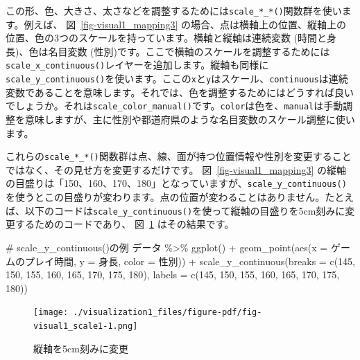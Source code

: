 \documentclass[
  a4paper,
  pandoc,
  ja=standard,
  jafont=haranoaji]{bxjsbook}
\newenvironment{Shaded}{\begin{snugshade}}{\end{snugshade}}
\newcommand{\AttributeTok}[1]{\textcolor[rgb]{0.00,0.48,0.65}{#1}}
\newcommand{\CommentTok}[1]{\textcolor[rgb]{0.37,0.37,0.37}{#1}}
\newcommand{\DecValTok}[1]{\textcolor[rgb]{0.68,0.00,0.00}{#1}}
\newcommand{\FunctionTok}[1]{\textcolor[rgb]{0.28,0.35,0.67}{#1}}
\newcommand{\NormalTok}[1]{\textcolor[rgb]{0.00,0.48,0.65}{#1}}
\newcommand{\SpecialCharTok}[1]{\textcolor[rgb]{0.37,0.37,0.37}{#1}}
\begin{document}
この形、色、大きさ、太さなどを調整するためには\texttt{scale\_*\_*()}関数群を使います。例えば、
図~\ref{fig-visual1_mapping3}
の場合、点は横軸上の位置、縦軸上の位置、色の3つのスケールを持っています。横軸と縦軸は連続変数
(時間と身長)、色は名目変数
(性別)です。ここで横軸のスケールを調整するためには\texttt{scale\_x\_continuous()}レイヤーを追加します。縦軸も同様に\texttt{scale\_y\_continuous()}を使います。ここの\texttt{x}と\texttt{y}はスケール、\texttt{continuous}は連続変数であることを意味します。それでは、色を調整するためにはどうすれば良いでしょうか。それは\texttt{scale\_color\_manual()}です。\texttt{color}は色を、\texttt{manual}は手動調整を意味しますが、主に性別や都道府県のような名目変数のスケール調整に使います。

これらの\texttt{scale\_*\_*()}関数群は点、線、面が持つ位置情報や性別を変更することではなく、その見せ方を変更するだけです。
図~\ref{fig-visual1_mapping3}
の縦軸の目盛りは「150、160、170、180」となっていますが、\texttt{scale\_y\_continuous()}を使うとこの目盛りが変わります。点の位置が変わることはありません。たとえば、以下のコードは\texttt{scale\_y\_continuous()}を使って縦軸の目盛りを5cm刻みに変更するためのコードであり、
図~\ref{fig-visual1_scale1} はその結果です。

\begin{Shaded}
\begin{Highlighting}[numbers=left,,]
\CommentTok{\# scale\_y\_continuous()の例}
\NormalTok{データ }\SpecialCharTok{\%\textgreater{}\%}
  \FunctionTok{ggplot}\NormalTok{() }\SpecialCharTok{+}
  \FunctionTok{geom\_point}\NormalTok{(}\FunctionTok{aes}\NormalTok{(}\AttributeTok{x =}\NormalTok{ ゲームのプレイ時間, }\AttributeTok{y =}\NormalTok{ 身長, }\AttributeTok{color =}\NormalTok{ 性別)) }\SpecialCharTok{+}
  \FunctionTok{scale\_y\_continuous}\NormalTok{(}\AttributeTok{breaks =} \FunctionTok{c}\NormalTok{(}\DecValTok{145}\NormalTok{, }\DecValTok{150}\NormalTok{, }\DecValTok{155}\NormalTok{, }\DecValTok{160}\NormalTok{, }\DecValTok{165}\NormalTok{, }\DecValTok{170}\NormalTok{, }\DecValTok{175}\NormalTok{, }\DecValTok{180}\NormalTok{),}
                     \AttributeTok{labels =} \FunctionTok{c}\NormalTok{(}\DecValTok{145}\NormalTok{, }\DecValTok{150}\NormalTok{, }\DecValTok{155}\NormalTok{, }\DecValTok{160}\NormalTok{, }\DecValTok{165}\NormalTok{, }\DecValTok{170}\NormalTok{, }\DecValTok{175}\NormalTok{, }\DecValTok{180}\NormalTok{))}
\end{Highlighting}
\end{Shaded}

\begin{figure}

{\centering \texttt{[image: ./visualization1\_files/figure-pdf/fig-visual1\_scale1-1.png]}

}

\caption{\label{fig-visual1_scale1}縦軸を5cm刻みに変更}

\end{figure}
\end{document}
